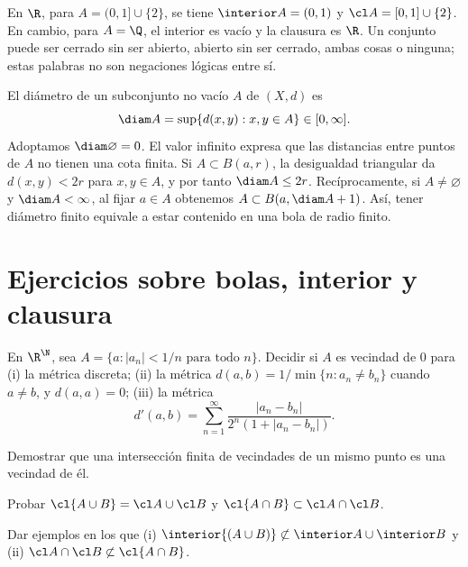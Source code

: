\begin{ejemplo}
En $\R$, para $A=(0,1]\cup\{2\}$, se tiene $\interior A=(0,1)$ y $\cl A=[0,1]\cup\{2\}$. En cambio, para $A=\Q$, el interior es vacío y la clausura es $\R$. Un conjunto puede ser cerrado sin ser abierto, abierto sin ser cerrado, ambas cosas o ninguna; estas palabras no son negaciones lógicas entre sí.
\end{ejemplo}

\begin{definicion}[Diámetro]
El diámetro de un subconjunto no vacío $A$ de $(X,d)$ es
\[
 \diam A=\sup\{d(x,y):x,y\in A\}\in[0,\infty].
\]
Adoptamos $\diam\varnothing=0$. El valor infinito expresa que las distancias entre puntos de $A$ no tienen una cota finita. Si $A\subset B(a,r)$, la desigualdad triangular da $d(x,y)<2r$ para $x,y\in A$, y por tanto $\diam A\le2r$. Recíprocamente, si $A\ne\varnothing$ y $\diam A<\infty$, al fijar $a\in A$ obtenemos $A\subset B(a,\diam A+1)$. Así, tener diámetro finito equivale a estar contenido en una bola de radio finito.
\end{definicion}

\section{Ejercicios sobre bolas, interior y clausura}
\begin{ejercicio}\label{ej:lectura-2-1}
En $\R^{\N}$, sea $A=\{a:|a_n|<1/n\text{ para todo }n\}$. Decidir si $A$ es vecindad de $0$ para (i) la métrica discreta; (ii) la métrica $d(a,b)=1/\min\{n:a_n\ne b_n\}$ cuando $a\ne b$, y $d(a,a)=0$; (iii) la métrica
\[
d'(a,b)=\sum_{n=1}^{\infty}\frac{|a_n-b_n|}{2^n(1+|a_n-b_n|)}.
\]
\end{ejercicio}


\begin{ejercicio}\label{ej:lectura-2-2}
Demostrar que una intersección finita de vecindades de un mismo punto es una vecindad de él.
\end{ejercicio}


\begin{ejercicio}\label{ej:lectura-2-3}
Probar $\cl{A\cup B}=\cl A\cup\cl B$ y $\cl{A\cap B}\subset\cl A\cap\cl B$.
\end{ejercicio}


\begin{ejercicio}\label{ej:lectura-2-4}
Dar ejemplos en los que (i) $\interior{(A\cup B)}\not\subset\interior A\cup\interior B$ y (ii) $\cl A\cap\cl B\not\subset\cl{A\cap B}$.
\end{ejercicio}


